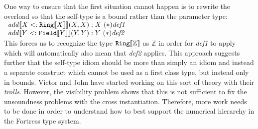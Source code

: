 \documentclass[preprint]{sigplanconf}
\newcommand{\ob}[1]{\ensuremath{\llbracket {#1} \rrbracket}}
\begin{document}
One way to ensure that the first situation cannot happen is to rewrite the overload so that the self-type
is a bound rather than the parameter type:\\

$\begin{array}{l}
{\it add}\ob{X <:{\tt Ring}\ob{X}}(X,X) : X~(*){\it def1}\\
{\it add}\ob{Y <: {\tt Field}\ob{Y}}(Y,Y) : Y~(*){\it def2}\\
\end{array}$\\

This forces us to recognize the type ${\tt Ring}\ob{\mathbb{Z}}$ as $\mathbb{Z}$ in order for {\it def1} to
apply which will automatically also mean that {\it def2} applies.  This approach suggests further that
the self-type idiom should be more than simply an idiom and instead a separate construct which cannot
be used as a first class type, but instead only in bounds.  Victor and John have started working on this
sort of theory with their {\it trolls}.  However, the visibility problem shows that this is not sufficient to fix the
unsoundness problems with the cross instantiation.  Therefore, more work needs to be done in order
to understand how to best support the numerical hierarchy in the Fortress type system.
\end{document}

